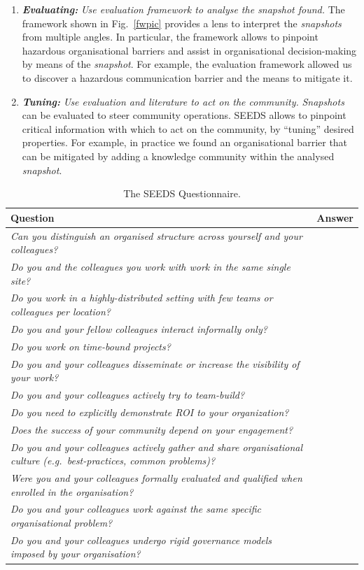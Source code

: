\begin{enumerate}
\item \emph{\bf Evaluating:} \emph{Use evaluation framework to analyse the \emph{snapshot} found.}
The framework shown in Fig.~\ref{fwpic} provides a lens to interpret the \emph{\emph{snapshots}} from multiple angles. In particular, the framework allows to pinpoint hazardous organisational barriers and assist in organisational decision-making by means of the \emph{snapshot}. For example, the evaluation framework allowed us to discover a hazardous communication barrier and the means to mitigate it.

\item \emph{\bf Tuning:} \emph{Use evaluation and literature \cite{ossslr} to act on the community.}
\emph{\emph{Snapshots}} can be evaluated to steer community operations. SEEDS allows to pinpoint critical information with which to act on the community, by ``tuning'' desired properties. For example, in practice we found an organisational barrier that can be mitigated by adding a knowledge community within the analysed \emph{snapshot}.

\end{enumerate}
\begin{table}
\hspace{1cm}

\begin{tabular}{|>{\raggedright}p{11cm}|>{\raggedright}p{1.5cm}|}
\hline 
\textbf{Question} & \textbf{Answer}\tabularnewline
\hline 
\emph{Can you distinguish an organised structure across yourself and
your colleagues?} & \tabularnewline
\hline 
\emph{Do you and the colleagues you work with work in the same single
site?} & \tabularnewline
\hline 
\emph{Do you work in a highly-distributed setting with few teams or
colleagues per location?} & \tabularnewline
\hline 
\emph{Do you and your fellow colleagues interact informally only?} & \tabularnewline
\hline 
\emph{Do you work on time-bound projects?} & \tabularnewline
\hline 
\emph{Do you and your colleagues disseminate or increase the visibility
of your work? } & \tabularnewline
\hline 
\emph{Do you and your colleagues actively try to team-build? } & \tabularnewline
\hline 
\emph{Do you need to explicitly demonstrate ROI to your organization? } & \tabularnewline
\hline 
\emph{Does the success of your community depend on your engagement? } & \tabularnewline
\hline 
\emph{Do you and your colleagues actively gather and share organisational
culture (e.g.~best-practices, common problems)?} & \tabularnewline
\hline 
\emph{Were you and your colleagues formally evaluated and qualified
when enrolled in the organisation? } & \tabularnewline
\hline 
\emph{Do you and your colleagues work against the same specific organisational
problem? } & \tabularnewline
\hline 
\emph{Do you and your colleagues undergo rigid governance models imposed
by your organisation? } & \tabularnewline
\hline 
\end{tabular}
\caption{The SEEDS Questionnaire.}\label{question}
\end{table}

